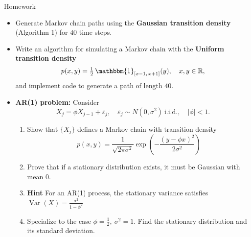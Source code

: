 \documentclass[8pt]{beamer}
\begin{document}
\begin{frame}{Homework}

\begin{itemize}
    \item Generate Markov chain paths using the \textbf{Gaussian transition density} (Algorithm 1) for $40$ time steps.
    \vspace{3mm}
    \item Write an algorithm for simulating a Markov chain with the \textbf{Uniform transition density}
    \begin{equation*}
        p(x,y) = \tfrac{1}{2}\,\mathbbm{1}_{[x-1,\,x+1]}(y),
        \quad x,y \in \mathbb{R},
    \end{equation*}
    and implement code to generate a path of length $40$.
	\item \textbf{AR(1) problem:} Consider
	\begin{equation*}
		X_j = \phi X_{j-1} + \varepsilon_j, 
		\quad \varepsilon_j \sim N(0,\sigma^2)\ \text{i.i.d.}, \quad |\phi|<1.
	\end{equation*}
	\begin{enumerate}
    	\item Show that $\{X_j\}$ defines a Markov chain with transition density
    	\begin{equation*}
    		p(x,y) = \frac{1}{\sqrt{2\pi\sigma^2}} 
    		\exp\!\left(-\frac{(y - \phi x)^2}{2\sigma^2}\right)
    	\end{equation*}

    	\item Prove that if a stationary distribution exists, it must be Gaussian with mean $0$.

    	\item \textbf{Hint} For an AR(1) process, the stationary variance satisfies $\operatorname{Var}(X) = \frac{\sigma^2}{1 - \phi^2}$
    	\item Specialize to the case $\phi=\tfrac{1}{2},\ \sigma^2=1$. Find the stationary distribution and its standard deviation.
\end{enumerate}
\end{itemize}
\end{frame}
\end{document}
